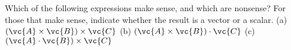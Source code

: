 Which of the following expressions make sense, and which
are nonsense? For those that make sense, indicate whether
the result is a vector or a scalar.\hwendpart
(a) $(\vc{A}\times\vc{B})\times\vc{C}$\hwendpart
(b) $(\vc{A}\times\vc{B})\cdot\vc{C}$\hwendpart
(c) $(\vc{A}\cdot\vc{B})\times\vc{C}$
